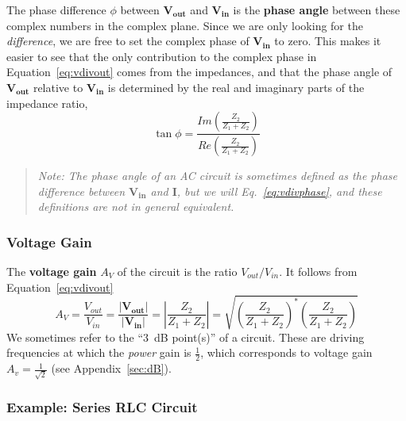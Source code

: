 \documentclass[11pt]{article}
\begin{document}
The phase difference $\phi$ between $\mathbf{V_{out}}$ and
$\mathbf{V_{in}}$ is the \textbf{phase angle} between these complex
numbers in the complex plane. Since we are only looking for the
\emph{difference}, we are free to set the complex phase of
$\mathbf{V_{in}}$ to zero. This makes it easier to see that the only
contribution to the complex phase in Equation~\ref{eq:vdivout} comes
from the impedances, and that the phase angle of $\mathbf{V_{out}}$
relative to $\mathbf{V_{in}}$ is determined by the real and imaginary
parts of the impedance ratio,
\begin{equation}
  \tan \phi = \frac{ Im \left( \frac{Z_2}{Z_1 + Z_2} \right) } { Re
    \left( \frac{Z_2}{Z_1 + Z_2} \right) }
  \label{eq:vdivphase}
\end{equation}

\begin{quote}
  \textit{Note: The phase angle of an AC circuit is sometimes defined
    as the phase difference between $\mathbf{V_{in}}$ and
    $\mathbf{I}$, but we will Eq.~\ref{eq:vdivphase}, and these
    definitions are not in general equivalent.}
\end{quote}

\subsubsection*{Voltage Gain}

The \textbf{voltage gain} $A_V$ of the circuit is the ratio
$V_{out}/V_{in}$. It follows from Equation~\ref{eq:vdivout}
\begin{equation}
  A_V = \frac{V_{out}}{V_{in}} =
  \frac{|\mathbf{V_{out}}|}{|\mathbf{V_{in}}|} = \left| \frac{Z_2}{Z_1
    + Z_2} \right| = \sqrt{ \left( \frac{Z_2}{Z_1 + Z_2} \right)^*
    \left( \frac{Z_2}{Z_1 + Z_2} \right) }
  \label{eq:gain}
\end{equation}
We sometimes refer to the ``3~dB point(s)'' of a circuit. These are
driving frequencies at which the \textit{power} gain is $\frac{1}{2}$,
which corresponds to voltage gain $A_v = \frac{1}{\sqrt{2}}$ (see
Appendix~\ref{sec:dB}).

\subsubsection*{Example: Series RLC Circuit}
\end{document}
